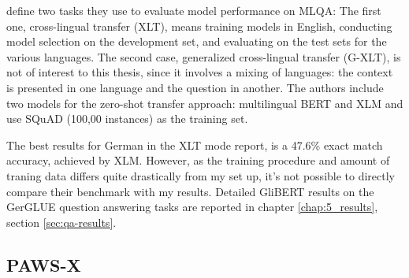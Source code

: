 


\label{chap:mlqa-sota}

\citeauthor{lewis2019mlqa} define two tasks they use to evaluate model performance on
MLQA: The first one, cross-lingual transfer (XLT), means training models in English,
conducting model selection on the development set, and evaluating on the test sets for
the various languages. The second case, generalized cross-lingual transfer (G-XLT), is
not of interest to this thesis, since it involves a mixing of languages: the context is
presented in one language and the question in another. The authors include two models
for the zero-shot transfer approach: multilingual BERT and XLM and use SQuAD (100,00
instances) as the training set.

The best results for German in the XLT mode \citeauthor{lewis2019mlqa} report, is a 47.6\% exact
match accuracy, achieved by XLM. However, as the training procedure and amount of traning data
differs quite drastically from my set up, it's not possible to directly compare their benchmark
with my results. Detailed GliBERT results on the GerGLUE question answering tasks are reported
in chapter \ref{chap:5_results}, section \ref{sec:qa-results}.




\subsection{PAWS-X}
\label{sec:paws-x}

